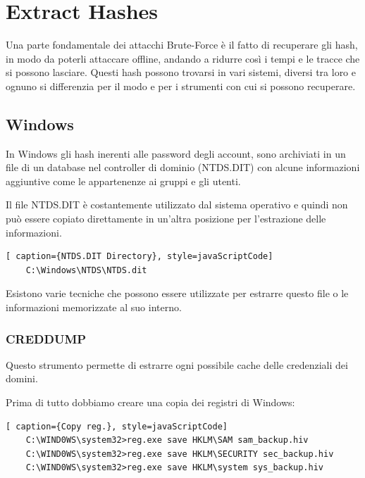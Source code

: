 \chapter{Extract Hashes}
Una parte fondamentale dei attacchi Brute-Force è il fatto di recuperare gli hash, in modo da poterli attaccare offline, andando a ridurre così i tempi e le tracce che si possono lasciare.
Questi hash possono trovarsi in vari sistemi, diversi tra loro e ognuno si differenzia per il modo e per i strumenti con cui si possono recuperare.
\section{Windows}
In Windows gli hash inerenti alle password degli account, sono archiviati in un file di un database nel controller di dominio (NTDS.DIT) con alcune informazioni aggiuntive come le appartenenze ai gruppi e gli utenti.

Il file NTDS.DIT è costantemente utilizzato dal sistema operativo e quindi non può essere copiato direttamente in un'altra posizione per l'estrazione delle informazioni.
\begin{lstlisting}[ caption={NTDS.DIT Directory}, style=javaScriptCode]
    C:\Windows\NTDS\NTDS.dit
\end{lstlisting}

Esistono varie tecniche che possono essere utilizzate per estrarre questo file o le informazioni memorizzate al suo interno.

\subsection{CREDDUMP}

Questo strumento\cite{CREDDUMP} permette di estrarre ogni possibile cache delle credenziali dei domini.

Prima di tutto dobbiamo creare una copia dei registri di Windows:

\begin{lstlisting}[ caption={Copy reg.}, style=javaScriptCode]
    C:\WIND0WS\system32>reg.exe save HKLM\SAM sam_backup.hiv
    C:\WIND0WS\system32>reg.exe save HKLM\SECURITY sec_backup.hiv
    C:\WIND0WS\system32>reg.exe save HKLM\system sys_backup.hiv
    \end{lstlisting}


